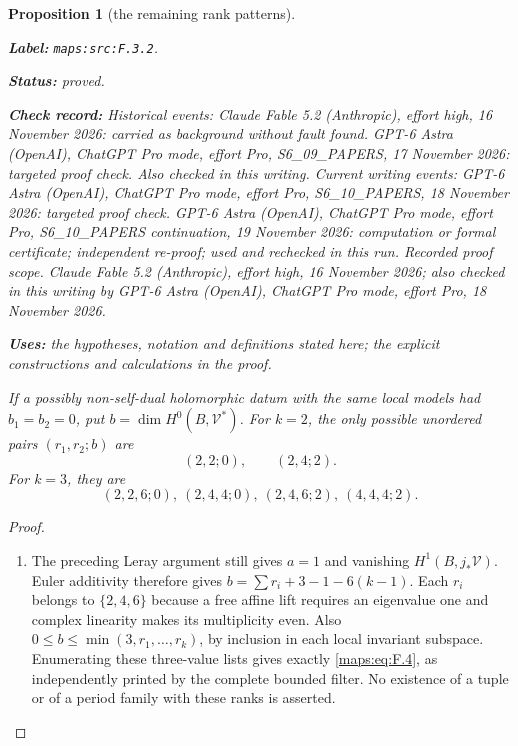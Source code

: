 \documentclass[11pt,a4paper]{article}
\newtheorem{proposition}[proposition]{Proposition}
\theoremstyle{definition}
\newcommand{\StatementRecord}[4]{\par\smallskip\begingroup\upshape\raggedright\noindent\textbf{Label:} \nolinkurl{#1}.\par\noindent\textbf{Status:} #2.\par\noindent\textbf{Check record:} #3.\par\noindent\textbf{Uses:} #4.\par\endgroup\smallskip}
\begin{document}
\begin{proposition}[the remaining rank patterns]\label{maps:src:F.3.2}
\StatementRecord{maps:src:F.3.2}{proved}{Historical events: Claude Fable 5.2 (Anthropic), effort high, 16 November 2026: carried as background without fault found. GPT-6 Astra (OpenAI), ChatGPT Pro mode, effort Pro, S6\_09\_PAPERS, 17 November 2026: targeted proof check. Also checked in this writing. Current writing events: GPT-6 Astra (OpenAI), ChatGPT Pro mode, effort Pro, S6\_10\_PAPERS, 18 November 2026: targeted proof check. GPT-6 Astra (OpenAI), ChatGPT Pro mode, effort Pro, S6\_10\_PAPERS continuation, 19 November 2026: computation or formal certificate; independent re-proof; used and rechecked in this run. \emph{Recorded proof scope.} Claude Fable 5.2 (Anthropic), effort high, 16 November 2026; also checked in this writing by GPT-6 Astra (OpenAI), ChatGPT Pro mode, effort Pro, 18 November 2026}{the hypotheses, notation and definitions stated here; the explicit constructions and calculations in the proof}


If a possibly non-self-dual holomorphic datum with the same
local models had $b_1=b_2=0$, put
$b=\dim H^0(B,\mathcal V^*)$.  For $k=2$, the only possible
unordered pairs $(r_1,r_2;b)$ are
\[
 (2,2;0),\qquad(2,4;2).
\]
For $k=3$, they are
\[
 (2,2,6;0),\ (2,4,4;0),\ (2,4,6;2),\ (4,4,4;2).
 \tag{F.4}\label{maps:eq:F.4}
\]

\end{proposition}


\begin{proof}
\begin{enumerate}[label=\arabic*.]
\item The preceding Leray argument still gives $a=1$ and vanishing
$H^1(B,j_*\mathcal V)$.  Euler additivity therefore gives
$b=\sum r_i+3-1-6(k-1)$.  Each $r_i$ belongs to
$\{2,4,6\}$ because a free affine lift requires an eigenvalue
one and complex linearity makes its multiplicity even.
Also $0\leq b\leq\min(3,r_1,\ldots,r_k)$, by inclusion in
each local invariant subspace.  Enumerating these three-value
lists gives exactly \eqref{maps:eq:F.4}, as independently printed by the
complete bounded filter.  No existence of a tuple or of a
period family with these ranks is asserted.

\end{enumerate}
\end{proof}
\end{document}
